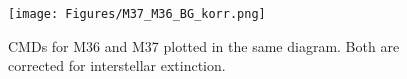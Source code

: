 \documentclass[fleqn,10pt]{SelfArx} %
\begin{document}
\begin{figure}
    \centering
    \texttt{[image: Figures/M37\_M36\_BG\_korr.png]}
    \caption{CMDs for M36 and M37 plotted in the same diagram. Both are corrected for interstellar extinction.}
    \label{fig:both}
\end{figure}




\end{document}
